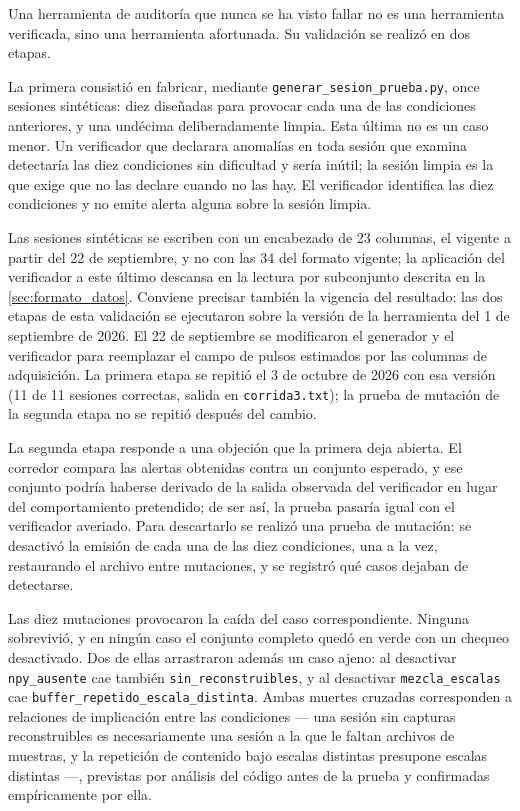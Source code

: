 Una herramienta de auditoría que nunca se ha visto fallar no es una
herramienta verificada, sino una herramienta afortunada. Su validación
se realizó en dos etapas.

La primera consistió en fabricar, mediante
\texttt{generar\_\allowbreak{}sesion\_\allowbreak{}prueba.py}, once sesiones sintéticas: diez
diseñadas para provocar cada una de las condiciones anteriores, y una
undécima deliberadamente limpia. Esta última no es un caso menor. Un
verificador que declarara anomalías en toda sesión que examina
detectaría las diez condiciones sin dificultad y sería inútil; la
sesión limpia es la que exige que no las declare cuando no las hay. El
verificador identifica las diez condiciones y no emite alerta alguna
sobre la sesión limpia.

Las sesiones sintéticas se escriben con un encabezado de 23 columnas,
el vigente a partir del 22 de septiembre, y no con las 34 del formato
vigente; la aplicación del verificador a este último descansa en la
lectura por subconjunto descrita en la
\cref{sec:formato_datos}. Conviene precisar también la vigencia
del resultado: las dos etapas de esta validación se ejecutaron sobre la versión
de la herramienta del 1 de septiembre de 2026. El 22 de septiembre se
modificaron el generador y el verificador para reemplazar el campo de
pulsos estimados por las columnas de adquisición. La primera etapa se
repitió el 3 de octubre de 2026 con esa versión (11 de 11
sesiones correctas, salida en \texttt{corrida3.txt}); la prueba de
mutación de la segunda etapa no se repitió después del cambio.

La segunda etapa responde a una objeción que la primera deja abierta.
El corredor compara las alertas obtenidas contra un conjunto esperado,
y ese conjunto podría haberse derivado de la salida observada del
verificador en lugar del comportamiento pretendido; de ser así, la
prueba pasaría igual con el verificador averiado. Para descartarlo se
realizó una prueba de mutación: se desactivó la emisión de cada una de
las diez condiciones, una a la vez, restaurando el archivo entre
mutaciones, y se registró qué casos dejaban de detectarse.

Las diez mutaciones provocaron la caída del caso correspondiente.
Ninguna sobrevivió, y en ningún caso el conjunto completo quedó en
verde con un chequeo desactivado. Dos de ellas arrastraron además un
caso ajeno: al desactivar \texttt{npy\_ausente} cae también
\texttt{sin\_\allowbreak{}reconstruibles}, y al desactivar \texttt{mezcla\_escalas}
cae \texttt{buffer\_\allowbreak{}repetido\_\allowbreak{}escala\_\allowbreak{}distinta}. Ambas muertes
cruzadas corresponden a relaciones de implicación entre las
condiciones --- una sesión sin capturas reconstruibles es
necesariamente una sesión a la que le faltan archivos de muestras, y
la repetición de contenido bajo escalas distintas presupone escalas
distintas ---, previstas por análisis del código antes de la prueba y
confirmadas empíricamente por ella.

